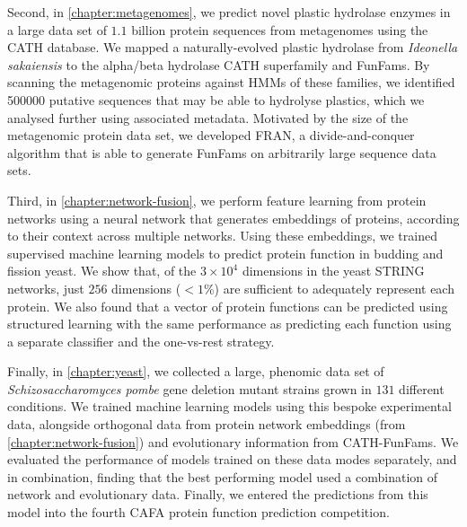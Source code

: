 Second, in \ref{chapter:metagenomes}, we predict novel plastic hydrolase enzymes in a large data set of $1.1$ billion protein sequences from metagenomes using the CATH database.
We mapped a naturally-evolved plastic hydrolase from \emph{Ideonella sakaiensis} to the alpha/beta hydrolase CATH superfamily and FunFams.
By scanning the metagenomic proteins against HMMs of these families, we identified \num{500000} putative sequences that may be able to hydrolyse plastics, which we analysed further using associated metadata.
Motivated by the size of the metagenomic protein data set, we developed FRAN, a divide-and-conquer algorithm that is able to generate FunFams on arbitrarily large sequence data sets.

Third, in \ref{chapter:network-fusion}, we perform feature learning from protein networks using a neural network that generates embeddings of proteins, according to their context across multiple networks.
Using these embeddings, we trained supervised machine learning models to predict protein function in budding and fission yeast.
We show that, of the $3 \times 10^4$ dimensions in the yeast STRING networks, just $256$ dimensions ($<1\%$) are sufficient to adequately represent each protein.
We also found that a vector of protein functions can be predicted using structured learning with the same performance as predicting each function using a separate classifier and the one-vs-rest strategy.

Finally, in \ref{chapter:yeast}, we collected a large, phenomic data set of \emph{Schizosaccharomyces pombe} gene deletion mutant strains grown in $131$ different conditions.
We trained machine learning models using this bespoke experimental data, alongside orthogonal data from protein network embeddings (from \ref{chapter:network-fusion}) and evolutionary information from CATH-FunFams.
We evaluated the performance of models trained on these data modes separately, and in combination, finding that the best performing model used a combination of network and evolutionary data.
Finally, we entered the predictions from this model into the fourth CAFA protein function prediction competition.


